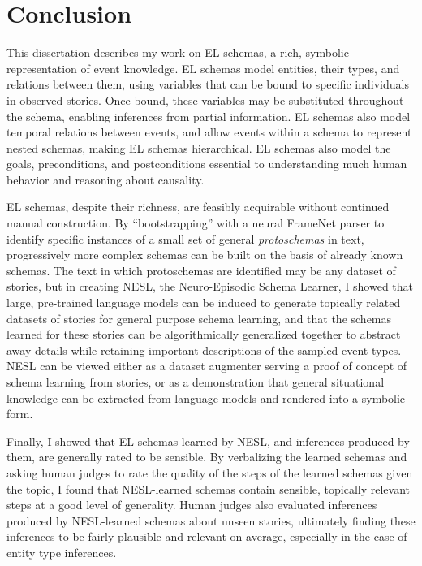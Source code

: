 \chapter{Conclusion}

This dissertation describes my work on EL schemas, a rich, symbolic representation of event knowledge. EL schemas model entities, their types, and relations between them, using variables that can be bound to specific individuals in observed stories. Once bound, these variables may be substituted throughout the schema, enabling inferences from partial information. EL schemas also model temporal relations between events, and allow events within a schema to represent nested schemas, making EL schemas hierarchical. EL schemas also model the goals, preconditions, and postconditions essential to understanding much human behavior and reasoning about causality.

EL schemas, despite their richness, are feasibly acquirable without continued manual construction. By ``bootstrapping'' with a neural FrameNet parser to identify specific instances of a small set of general \textit{protoschemas} in text, progressively more complex schemas can be built on the basis of already known schemas. The text in which protoschemas are identified may be any dataset of stories, but in creating NESL, the Neuro-Episodic Schema Learner, I showed that large, pre-trained language models can be induced to generate topically related datasets of stories for general purpose schema learning, and that the schemas learned for these stories can be algorithmically generalized together to abstract away details while retaining important descriptions of the sampled event types. NESL can be viewed either as a dataset augmenter serving a proof of concept of schema learning from stories, or as a demonstration that general situational knowledge can be extracted from language models and rendered into a symbolic form.

Finally, I showed that EL schemas learned by NESL, and inferences produced by them, are generally rated to be sensible. By verbalizing the learned schemas and asking human judges to rate the quality of the steps of the learned schemas given the topic, I found that NESL-learned schemas contain sensible, topically relevant steps at a good level of generality. Human judges also evaluated inferences produced by NESL-learned schemas about unseen stories, ultimately finding these inferences to be fairly plausible and relevant on average, especially in the case of entity type inferences.

